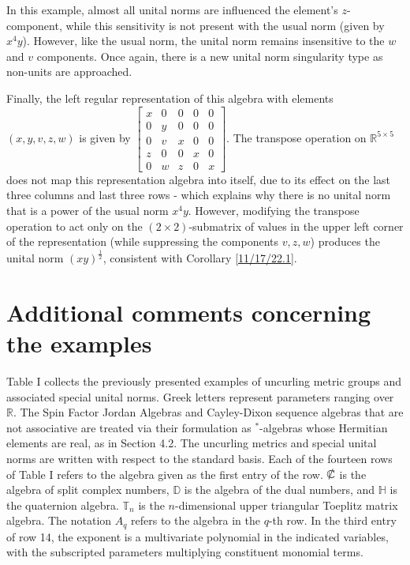 \documentclass{amsart}
\numberwithin{equation}{section}
\theoremstyle{definition}
\numberwithin{theorem}{section}
\begin{document}
In this example, almost all unital norms are influenced the element's $z$-component, while this sensitivity is not present with the usual norm (given by $x^4y$).  However, like the usual norm,  the unital norm remains insensitive to the $w$ and $v$ components.  Once again, there is a new unital norm singularity type as non-units are approached.  

Finally, the left regular representation of this algebra with elements $(x,y,v,z,w)$ is given by $ \left[
\begin{array}{ccccc}
x & 0 & 0 & 0 & 0   \\
0 & y & 0 & 0 & 0 \\
0 & v &  x & 0 & 0  \\
z & 0 &  0 & x & 0  \\
0 & w &  z & 0 & x
\end{array}
\right].$
The transpose operation on $\mathbb{R}^{5\times 5}$ does not map this representation algebra into itself, due to its effect on the last three columns and last three rows - which explains why there is no unital norm that is a power of the usual norm $x^4y$.  However, modifying the transpose operation to act only on the $(2\times 2)$-submatrix of values in the upper left corner of the representation (while suppressing the components $v,z,w$) produces the unital norm $(xy)^\frac{1}{2}$, consistent with Corollary \ref{11/17/22.1}.
 
\section{Additional comments concerning the examples}

Table I collects the previously presented examples of uncurling metric groups and associated special unital norms.  Greek letters represent parameters ranging over $\mathbb{R}$.  The Spin Factor Jordan Algebras and Cayley-Dixon sequence algebras that are not associative are treated via their formulation as $^*$-algebras whose Hermitian elements are real, as in Section 4.2. The uncurling metrics and special unital norms are written with respect to the standard basis.  Each of the fourteen rows of Table I refers to the algebra given as the first entry of the row.  $\slashed{\mathbb{C}}$ is the algebra of split complex numbers, $\mathbb{D}$ is the algebra of the dual numbers, and $\mathbb{H}$ is the quaternion algebra.  $\mathbb{T}_n$ is the $n$-dimensional upper triangular Toeplitz matrix algebra.  The notation $A_q$ refers to the algebra in the $q$-th row.  In the third entry of row 14, the exponent is a multivariate polynomial in the indicated variables, with the subscripted parameters multiplying constituent monomial terms.
\end{document}

